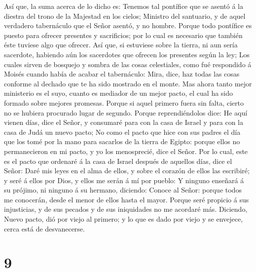  Así que, la suma acerca de lo dicho es: Tenemos tal
pontífice que se asentó á la diestra del trono de la Majestad en los
cielos;  Ministro del santuario, y de aquel verdadero
tabernáculo que el Señor asentó, y no hombre.  Porque todo
pontífice es puesto para ofrecer presentes y sacrificios; por lo cual es
necesario que también éste tuviese algo que ofrecer.  Así
que, si estuviese sobre la tierra, ni aun sería sacerdote, habiendo aún
los sacerdotes que ofrecen los presentes según la ley;  Los
cuales sirven de bosquejo y sombra de las cosas celestiales, como fué
respondido á Moisés cuando había de acabar el tabernáculo: Mira, dice,
haz todas las cosas conforme al dechado que te ha sido mostrado en el
monte.  Mas ahora tanto mejor ministerio es el suyo, cuanto
es mediador de un mejor pacto, el cual ha sido formado sobre mejores
promesas.  Porque si aquel primero fuera sin falta, cierto
no se hubiera procurado lugar de segundo.  Porque
reprendiéndolos dice: He aquí vienen días, dice el Señor, y consumaré
para con la casa de Israel y para con la casa de Judá un nuevo pacto;
 No como el pacto que hice con sus padres el día que los
tomé por la mano para sacarlos de la tierra de Egipto: porque ellos no
permanecieron en mi pacto, y yo los menosprecié, dice el Señor.
 Por lo cual, este es el pacto que ordenaré á la casa de
Israel después de aquellos días, dice el Señor: Daré mis leyes en el
alma de ellos, y sobre el corazón de ellos las escribiré; y seré á ellos
por Dios, y ellos me serán á mí por pueblo:  Y ninguno
enseñará á su prójimo, ni ninguno á su hermano, diciendo: Conoce al
Señor: porque todos me conocerán, desde el menor de ellos hasta el
mayor.  Porque seré propicio á sus injusticias, y de sus
pecados y de sus iniquidades no me acordaré más.  Diciendo,
Nuevo pacto, dió por viejo al primero; y lo que es dado por viejo y se
envejece, cerca está de desvanecerse.

\hypertarget{section-8}{%
\section{9}\label{section-8}}

